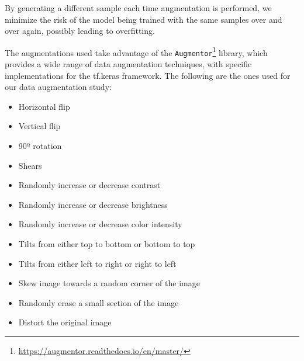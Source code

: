     By generating a different sample each time augmentation is performed, we minimize the risk of the model being trained with the same samples over and over again, possibly leading to overfitting. \par 
    
    The augmentations used take advantage of the  \verb|Augmentor|\footnote{\url{https://augmentor.readthedocs.io/en/master/}} library, which provides a wide range of data augmentation techniques, with specific implementations for the tf.keras framework. The following are the ones used for our data augmentation study:
    
    \begin{itemize}
        \item Horizontal flip
        \item Vertical flip
        \item 90º rotation
        \item Shears
        \item Randomly increase or decrease contrast
        \item Randomly increase or decrease brightness
        \item Randomly increase or decrease color intensity
        \item Tilts from either top to bottom or bottom to top
        \item Tilts from either left to right or right to left
        \item Skew image towards a random corner of the image
        \item Randomly erase a small section of the image
        \item Distort the original image
    \end{itemize}
    

